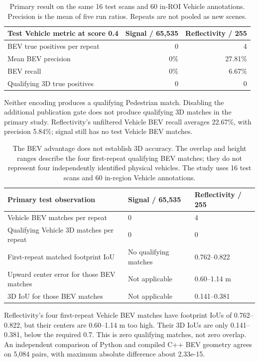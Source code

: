 \documentclass[11pt,a4paper]{article}
\begin{document}
\begin{table}[htbp]\centering
\begin{tabularx}{\linewidth}{@{}Yrr@{}}
\toprule
Test Vehicle metric at score 0.4 & Signal / 65,535 & Reflectivity / 255 \\
\midrule
BEV true positives per repeat & 0 & 4 \\
Mean BEV precision & 0\% & 27.81\% \\
BEV recall & 0\% & 6.67\% \\
Qualifying 3D true positives & 0 & 0 \\
\bottomrule
\end{tabularx}
\caption{Primary result on the same 16 test scans and 60 in-ROI Vehicle
annotations. Precision is the mean of five run ratios. Repeats are not pooled
as new scenes.}
\label{tab:primary}
\end{table}

Neither encoding produces a qualifying Pedestrian match. Disabling the
additional publication gate does not produce qualifying 3D matches in the
primary study. Reflectivity's unfiltered Vehicle BEV recall averages 22.67\%,
with precision 5.84\%; signal still has no test Vehicle BEV matches.

\begin{table}[htbp]
\centering\small
\begin{tabularx}{\linewidth}{@{}Yll@{}}
\toprule
Primary test observation & Signal / 65,535 & Reflectivity / 255 \\ \midrule
Vehicle BEV matches per repeat & 0 & 4 \\
Qualifying Vehicle 3D matches per repeat & 0 & 0 \\
First-repeat matched footprint IoU & No qualifying matches & 0.762--0.822 \\
Upward center error for those BEV matches & Not applicable & 0.60--1.14 m \\
3D IoU for those BEV matches & Not applicable & 0.141--0.381 \\
\bottomrule
\end{tabularx}
\caption{The BEV advantage does not establish 3D accuracy. The overlap and height ranges describe the four first-repeat qualifying BEV matches; they do not represent four independently identified physical vehicles. The study uses 16 test scans and 60 in-region Vehicle annotations.}
\label{tab:channel-overlap-summary}
\end{table}

Reflectivity's four first-repeat Vehicle BEV matches have footprint IoUs of
0.762--0.822, but their centers are 0.60--1.14 m too high. Their 3D IoUs are only
0.141--0.381, below the required 0.7. This is zero qualifying matches, not zero
overlap. An independent comparison of Python and compiled C++ BEV geometry
agrees on 5,084 pairs, with maximum absolute difference about 2.33e-15.
\end{document}

